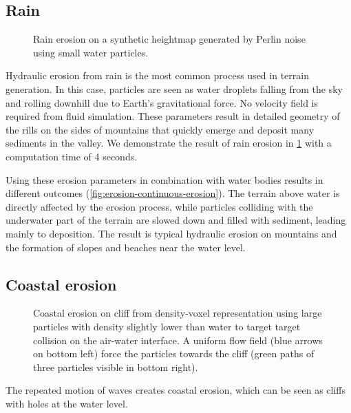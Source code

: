 \subsection{Rain}

\begin{figure}[H]
    \caption[Rain erosion simulation]{Rain erosion on a synthetic heightmap generated by Perlin noise using small water particles. }
    \label{fig:erosion-results-rain}
\end{figure}

Hydraulic erosion from rain is the most common process used in terrain generation. In this case, particles are seen as water droplets falling from the sky and rolling downhill due to Earth's gravitational force. No velocity field is required from fluid simulation. These parameters result in detailed geometry of the rills on the sides of mountains that quickly emerge and deposit many sediments in the valley.  
We demonstrate the result of rain erosion in \cref{fig:erosion-results-rain} with a computation time of 4 seconds.%

Using these erosion parameters in combination with water bodies results in different outcomes (\cref{fig:erosion-continuous-erosion}). The terrain above water is directly affected by the erosion process, while particles colliding with the underwater part of the terrain are slowed down and filled with sediment, leading mainly to deposition. The result is typical hydraulic erosion on mountains and the formation of slopes and beaches near the water level.

\subsection{Coastal erosion}

\begin{figure}[H]
    \caption[Coastal erosion simulation]{Coastal erosion on cliff from density-voxel representation using large particles with density slightly lower than water to target target collision on the air-water interface. A uniform flow field (blue arrows on bottom left) force the particles towards the cliff (green paths of three particles visible in bottom right). }
    \label{fig:erosion-results-coastal}
\end{figure}

The repeated motion of waves creates coastal erosion, which can be seen as cliffs with holes at the water level.

